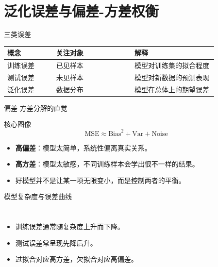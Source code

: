 \documentclass[aspectratio=169,professionalfonts]{beamer}
\newcommand{\Var}{\mathrm{Var}}
\newcommand{\Bias}{\mathrm{Bias}}
\newcommand{\MSE}{\mathrm{MSE}}
\begin{document}
\section{泛化误差与偏差-方差权衡}

\begin{frame}{三类误差}
    \begin{table}
        \centering
        \begin{tabular}{>{\raggedright\arraybackslash}p{0.2\linewidth} >{\raggedright\arraybackslash}p{0.32\linewidth} >{\raggedright\arraybackslash}p{0.34\linewidth}}
            \toprule
            概念 & 关注对象 & 解释 \\
            \midrule
            训练误差 & 已见样本 & 模型对训练集的拟合程度 \\
            测试误差 & 未见样本 & 模型对新数据的预测表现 \\
            泛化误差 & 数据分布 & 模型在总体上的期望误差 \\
            \bottomrule
        \end{tabular}
    \end{table}
\end{frame}

\begin{frame}{偏差-方差分解的直觉}
    \begin{block}{核心图像}
        \[
            \MSE \approx \Bias^2 + \Var + \text{Noise}
        \]
    \end{block}

    \begin{itemize}
        \item \textbf{高偏差}：模型太简单，系统性偏离真实关系。
        \item \textbf{高方差}：模型太敏感，不同训练样本会学出很不一样的结果。
        \item 好模型并不是让某一项无限变小，而是控制两者的平衡。
    \end{itemize}
\end{frame}

\begin{frame}{模型复杂度与误差曲线}
    \begin{columns}[c,onlytextwidth]
        \begin{itemize}
            \item 训练误差通常随复杂度上升而下降。
            \item 测试误差常呈现先降后升。
            \item 过拟合对应高方差，欠拟合对应高偏差。
        \end{itemize}
    \end{columns}
\end{frame}
\end{document}
